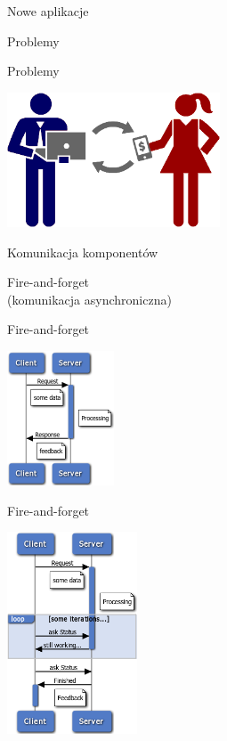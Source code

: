 \documentclass{beamer}
\begin{document}
\begin{frame}{Nowe aplikacje}
	\begin{center}
		\Huge{Problemy}
	\end{center}
\end{frame}

\begin{frame}{Problemy}
	\begin{center}
		\includegraphics[height=4cm]{pay1.png}
	\end{center}
\end{frame}

\begin{frame}{Komunikacja komponentów}
	\begin{center}
		\Huge{Fire-and-forget}\\
		\huge{(komunikacja asynchroniczna)}
	\end{center}
\end{frame}

\begin{frame}{Fire-and-forget}
	\begin{center}
		\includegraphics[height=4cm]{async1.png}
	\end{center}
\end{frame}

\begin{frame}{Fire-and-forget}
	\begin{center}
		\includegraphics[height=6cm]{async2.png}
	\end{center}
\end{frame}
\end{document}
